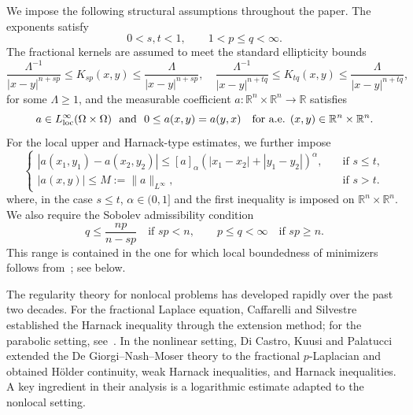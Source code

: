 \documentclass[reqno]{amsart}
\newcommand{\R}{\mathbb R}
\theoremstyle{plain}
\theoremstyle{definition}
\theoremstyle{remark}
\numberwithin{equation}{section}
\begin{document}
We impose the following structural assumptions throughout the paper. The
exponents satisfy
\begin{equation}\label{eq:exponents}
    0<s,t<1,\qquad 1<p\le q<\infty.
\end{equation}
The fractional kernels are assumed to meet the standard ellipticity bounds
\begin{equation}\label{eq:kernel-bounds}
    \frac{\Lambda^{-1}}{|x-y|^{n+sp}}
    \le K_{sp}(x,y)\le
    \frac{\Lambda}{|x-y|^{n+sp}},\quad
    \frac{\Lambda^{-1}}{|x-y|^{n+tq}}
    \le K_{tq}(x,y)\le
    \frac{\Lambda}{|x-y|^{n+tq}},
\end{equation}
for some \(\Lambda\ge1\), and the measurable coefficient $a:\mathbb{R}^n\times\mathbb{R}^n\rightarrow\mathbb{R}$ satisfies
\begin{equation}\label{eq:a-basic}
  a\in L^\infty_{\rm loc}(\Omega\times\Omega) \ \ \text{and}\ \  0\le a(x,y)=a(y,x)
    \quad\text{for a.e. }(x,y)\in\R^n\times\R^n.
\end{equation}
For the local upper and Harnack-type estimates, we further impose
\begin{equation}\label{eq:a-regular}
\begin{cases}
|a(x_1,y_1)-a(x_2,y_2)|\le [a]_\alpha(|x_1-x_2|+|y_1-y_2|)^\alpha, \quad &\text{if } s\le t,  \\[2mm]%
|a(x,y)|\le M:=\|a\|_{L^\infty}, \quad &\text{if } s>t.
\end{cases}
\end{equation}
where, in the case \(s\le t\), \(\alpha\in(0,1]\) and the first inequality is
imposed on \(\R^n\times\R^n\). We also require the Sobolev admissibility condition
\begin{equation}\label{eq:sobolev-range}
    q\le\frac{np}{n-sp}
    \quad\text{if }sp<n,
    \qquad
    p\le q<\infty
    \quad\text{if }sp\ge n.
\end{equation}
This range is contained in the one for which local boundedness of minimizers
follows from~\cite[Theorem~2.9]{FKZ26}; see  below.

The regularity theory for nonlocal problems has developed rapidly over the
past two decades. For the fractional Laplace equation, Caffarelli and
Silvestre~\cite{CS07} established the Harnack inequality through the extension
method; for the parabolic setting, see~\cite{Str19,KW24}. In the nonlinear
setting, Di Castro, Kuusi and Palatucci~\cite{DKP14,DKP16} extended the
De Giorgi--Nash--Moser theory to the fractional \(p\)-Laplacian and obtained
H\"older continuity, weak Harnack inequalities, and Harnack inequalities. A
key ingredient in their analysis is a logarithmic estimate adapted to the
nonlocal setting.
\end{document}
